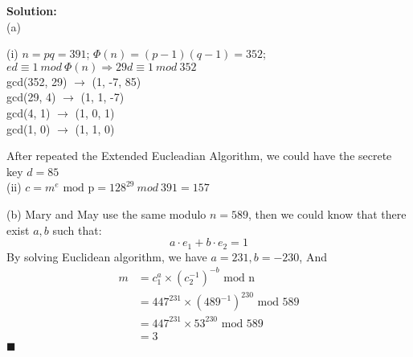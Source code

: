 \documentclass{article}
\newenvironment{solution}                               %
{\textbf{Solution:} \\}{$\blacksquare$\newline}         %
\newcommand{\leadto}{\Rightarrow}                       %
\newcommand{\modP}{\text{ mod p}}
\begin{document}
    \begin{solution}
        (a)

        (i) $n=pq=391$; $\Phi(n) = (p-1)(q-1) = 352$; \\
        ${ed \equiv 1\ mod\ \Phi(n)} \leadto {29d \equiv 1\ mod\ 352}$ \\

        gcd(352, 29) $\rightarrow$ (1, -7, 85)\\
        gcd(29, 4)   $\rightarrow$ (1, 1, -7)\\
        gcd(4, 1)    $\rightarrow$ (1, 0, 1)\\
        gcd(1, 0)    $\rightarrow$ (1, 1, 0)

        After repeated the Extended Eucleadian Algorithm, we could have the secrete key $d=85$
        \\
        (ii) $c = m^e \modP = 128^{29}\ mod\ 391 = 157$

        (b) Mary and May use the same modulo $n=589$, then we could know that there exist $a,b$ such that:
        $$
            a \cdot e_1 + b \cdot e_2 = 1
        $$
        By solving Euclidean algorithm, we have $a=231, b=-230$, And 
        \begin{align*}
            m &= c_1^{a} \times (c_2^{-1})^{-b} \text{ mod n} \\
              &= 447^231 \times (489^{-1})^230 \text{ mod 589} \\
              &= 447^231 \times 53^230 \text{ mod 589} \\
              &= 3
        \end{align*}
    \end{solution}
\end{document}
